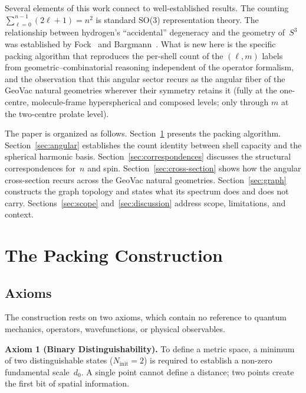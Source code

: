\documentclass[aps,prl,reprint,amsmath,amssymb]{revtex4-2}
\begin{document}
\medskip

Several elements of this work connect to well-established results.
The counting $\sum_{\ell=0}^{n-1}(2\ell+1) = n^2$ is standard SO(3)
representation theory.  The relationship between hydrogen's
``accidental'' degeneracy and the geometry of~$S^3$ was established by
Fock~\cite{fock1935} and Bargmann~\cite{bargmann1936}.  What is new
here is the specific packing algorithm that reproduces the per-shell
count of the $(\ell, m)$ labels from geometric--combinatorial reasoning independent of the
operator formalism, and the observation that this angular sector
recurs as the angular fiber of the GeoVac natural geometries wherever
their symmetry retains it (fully at the one-centre, molecule-frame
hyperspherical and composed levels; only through $m$ at the two-centre
prolate level).

The paper is organized as follows.
Section~\ref{sec:construction} presents the packing algorithm.
Section~\ref{sec:angular} establishes the count identity between shell
capacity and the spherical harmonic basis.
Section~\ref{sec:correspondences} discusses the structural
correspondences for~$n$ and spin.
Section~\ref{sec:cross-section} shows how the angular cross-section
recurs across the GeoVac natural geometries.
Section~\ref{sec:graph} constructs the graph topology and states what
its spectrum does and does not carry.
Sections~\ref{sec:scope} and~\ref{sec:discussion} address scope,
limitations, and context.


\section{The Packing Construction}
\label{sec:construction}

\subsection{Axioms}

The construction rests on two axioms, which contain no reference to
quantum mechanics, operators, wavefunctions, or physical observables.

\medskip

\noindent\textbf{Axiom 1 (Binary Distinguishability).}
To define a metric space, a minimum of two distinguishable states
($N_{\mathrm{init}} = 2$) is required to establish a non-zero
fundamental scale~$d_0$.  A single point cannot define a distance; two
points create the first bit of spatial information.
\end{document}
